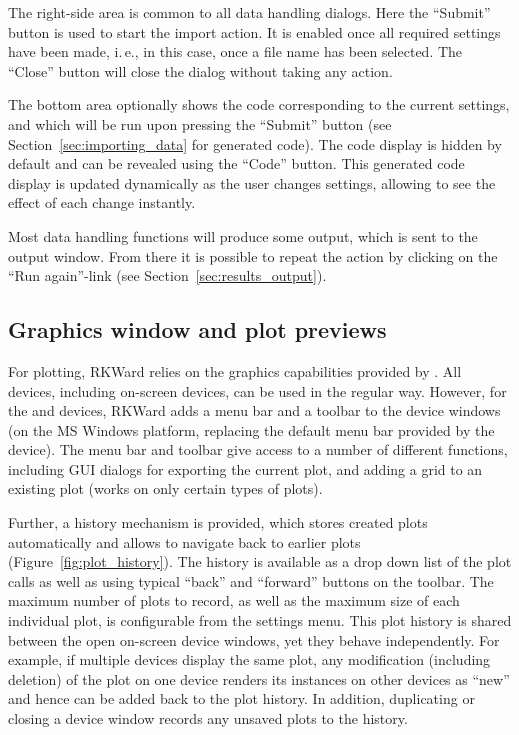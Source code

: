 The right-side area is common to all data handling
dialogs. Here the ``Submit'' button is used
to start the import action. It is enabled once all required
settings have been made, i.\,e., in this case, once a file name has been
selected. The ``Close'' button will close the
dialog without taking any action.

The bottom area optionally shows the 
code corresponding to the current settings, and which will be run
upon pressing the ``Submit'' button (see Section~\ref{sec:importing_data} for generated  code). 
The code display is hidden by default and can be revealed using
the ``Code'' button. This 
generated code display is updated dynamically as the user changes settings, allowing
to see the effect of each change instantly.

Most data handling functions will produce some output, which is
sent to the output window. From there it is possible to repeat the
action by clicking on the ``Run again''-link
(see Section~\ref{sec:results_output}).

\subsection{Graphics window and plot previews}
\label{sec:plot_previews}

For plotting, RKWard relies on the graphics capabilities provided by
. All 
devices, including on{}-screen devices, can be used in the regular way.
However, for the  and  devices, RKWard adds a menu
bar and a toolbar to the device windows (on the MS Windows platform,
replacing the default menu bar provided by the device). The menu
bar and toolbar give access to a number of different functions,
including GUI dialogs for exporting the current plot,
and adding a grid to an existing plot 
(works on only certain types of plots).

Further, a history mechanism is provided,
which stores created plots automatically and allows to navigate
back to earlier plots (Figure~\ref{fig:plot_history}). 
The history is available as a drop down list of the plot calls as well as using typical ``back''
and ``forward'' buttons on the toolbar.
The maximum number
of plots to record, as well as the maximum size of each individual plot,
is configurable from the settings menu. This plot history is shared
between the open on{}-screen device windows, yet they behave
independently. For example, if multiple devices display the same
plot, any modification (including deletion) of the plot on one device
renders its instances on other devices as ``new'' and hence can be added
back to the plot history. In addition, duplicating or closing a device
window records any unsaved plots to the history.

